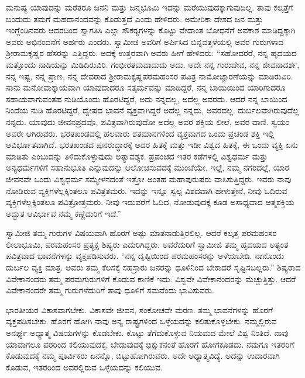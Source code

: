  ಮನುಷ್ಯ ಯಾವುದನ್ನು ಮರೆತರೂ ಜನನಿ ಮತ್ತು ಜನ್ಮಭೂಮಿ ಇದನ್ನು ಮರೆಯುವುದಕ್ಕಾಗುವುದಿಲ್ಲ. ತಾವು ಕಲ್ಕತ್ತೆಗೆ ಬಂದುದು ತಮಗೆ ಮಹದಾನಂದವನ್ನು ಕೊಡುತ್ತದೆ ಎಂದು ಹೇಳಿದರು. ಅಮೇರಿಕಾ ದೇಶದ ಜನ ಮತ್ತು ಇಂಗ್ಲೆಂಡಿನವರು ಆದರದಿಂದ ಸ್ವಾಗತಿಸಿ ಎಲ್ಲಾ ಸೌಕರ‍್ಯಗಳನ್ನು ಕೊಟ್ಟು ವೇದಾಂತ ಬೋಧನೆಗೆ ಅವಕಾಶ ಮಾಡಿದ್ದಕ್ಕಾಗಿ ಅವರು ಅಭಿನಂದನೆಗೆ ಅರ್ಹರು ಎಂದರು. ಸ್ವಾಮೀಜಿ ಅವರಿಗೆ ಅರ್ಪಿಸಿದ ಬಿನ್ನವತ್ತಳೆಯಲ್ಲಿ ಅವರ ಗುರುಗಳಾದ ಶ‍್ರೀರಾಮಕೃಷ್ಣರ ಹೆಸರನ್ನು ಎತ್ತಿದ್ದರು. ಅದಕ್ಕೆ ಉತ್ತರವಾಗಿ ಅವರು ಹೀಗೆ ಹೇಳಿದರು: “ಸಹೋದರರೆ, ನನ್ನ ಹೃದಯದ ಮತ್ತೊಂದು ನಾಡಿಯನ್ನು ಮಿಡಿದಿರುವಿರಿ. ಗಂಭೀರತಮವಾದುದು ಅದು. ಅದೇ ನನ್ನ ಗುರುದೇವ, ನನ್ನ ಜೀವನಾದರ್ಶ, ನನ್ನ ಇಷ್ಟ, ನನ್ನ ಪ್ರಾಣ, ನನ್ನ ದೇವರಾದ ಶ‍್ರೀರಾಮಕೃಷ್ಣಪರಮಹಂಸರ ಪವಿತ್ರ ನಾಮೋಚ್ಚಾರಣೆಯನ್ನು ಮಾಡಿರುವಿರಿ. ನಾನು ಮನೋವಾಕ್ಕಾಯವಾಗಿ ಯಾವುದಾದರೂ ಸತ್ಕರ್ಮವನ್ನು ಮಾಡಿದ್ದರೆ, ನನ್ನ ಬಾಯಿಯಿಂದ ಯಾರಿಗಾದರೂ ಸಹಾಯವಾಗುವಂತಹ ನುಡಿಯೊಂದು ಹೊರಟಿದ್ದರೆ, ಅದು ನನ್ನದಲ್ಲ, ಅದೆಲ್ಲ ಅವರದು. ಆದರೆ ನನ್ನ ಬಾಯಿಂದ ನಿಂದೆಯ ನುಡಿ ಹೊರಟಿದ್ದರೆ, ದ್ವೇಷದ ಭಾವನೆ ವ್ಯಕ್ತವಾಗಿದ್ದರೆ ಅದೆಲ್ಲ ನನ್ನದು, ಅವರದಲ್ಲ. ದುರ್ಬಲವಾಗಿರುವುದೆಲ್ಲ ನನ್ನದು. ಯಾವುದು ಜೀವನಪ್ರದವೊ, ಪವಿತ್ರವಾಗಿರುವುದೋ ಅದೆಲ್ಲ ಅವರ ಶಕ್ತಿಯ ಲೀಲೆ, ಅವರ ವಾಣಿ. ಸ್ವಯಂ ಅವರೇ ಆಗಿರುವರು. ಭರತಖಂಡದಲ್ಲಿ ಹಲವಾರು ಶತಮಾನಗಳಿಂದ ವ್ಯಕ್ತವಾಗದ ಒಂದು ಪ್ರಚಂಡ ಶಕ್ತಿ ಇಲ್ಲಿ ಆವಿರ್ಭೂತವಾಗಿದೆ. ಭರತಖಂಡದ ಪುನರುದ್ಧಾರಕ್ಕೆ ಅದರ ಹಿತಕ್ಕೆ ಮತ್ತು ಇಡೀ ವಿಶ್ವದ ಹಿತಕ್ಕೆ, ಈ ಒಂದು ವ್ಯಕ್ತಿ ಏನು ಮಾಡಿತು ಎಂಬುದನ್ನು ತಿಳಿದುಕೊಳ್ಳುವುದು ಅತ್ಯಾವಶ್ಯಕ. ಪ್ರಪಂಚದ ಇತರ ಕಡೆಗಳಲ್ಲಿ ವಿಶ್ವಧರ್ಮ ಮತ್ತು ಅನ್ಯಧರ್ಮಗಳಿಗೆ ಸಹಾನುಭೂತಿ ಎನ್ನುವುದನ್ನು ಆಲೋಚಿಸುವದಕ್ಕೆ ಮುಂಚೆಯೇ, ಇಲ್ಲೆ, ನಮ್ಮ ನಗರದಲ್ಲೆ, ಯಾರ ಜೀವನವೇ ಒಂದು ವಿಶ್ವಧರ್ಮ ಸಮ್ಮೇಳನದಂತೆ ಇತ್ತೋ ಅಂತಹ ಮಹಾಪುರುಷರು ವಾಸಿಸುತ್ತಿದ್ದರು. ಇವರು ನಾವು ನೋಡಿರುವ ವ್ಯಕ್ತಿಗಳೆಲ್ಲಕ್ಕಿಂತಲೂ ಪವಿತ್ರತಮರು. ಇದನ್ನು ಇನ್ನೂ ಸ್ವಲ್ಪ ವಿಶದವಾಗಿ ಹೇಳುತ್ತೇನೆ, ನೀವು ಓದಿರುವ ವ್ಯಕ್ತಿಗಳೆಲ್ಲಕ್ಕಿಂತಲೂ ಪವಿತ್ರೋತ್ತಮರು. ನೀವು ಇದುವರೆಗೆ ಓದಿದ, ನೋಡುವುದಕ್ಕೆ ಕೂಡ ಅಸಾಧ್ಯವಾದ ಆತ್ಮಶಕ್ತಿಯ ಅದ್ಭುತ ಆವಿರ್ಭಾವ ನಮ್ಮ ಕಣ್ಣೆದುರಿಗೆ ಇದೆ.” 

 ಸ್ವಾಮೀಜಿ ತಮ್ಮ ಗುರುಗಳ ವಿಷಯವಾಗಿ ಹೊರಗೆ ಅಷ್ಟು ಮಾತನಾಡುತ್ತಿರಲಿಲ್ಲ. ಆದರೆ ಕಲ್ಕತ್ತ ಪರಮಹಂಸರ ಲೀಲಾಭೂಮಿ, ಪರಮಹಂಸರ ಪ್ರತ್ಯಕ್ಷ ಶಿಷ್ಯರು ಎದುರಿಗಿದ್ದರು. ಅವರೆದುರಿಗೆ ಸ್ವಾಮೀಜಿ ತಮ್ಮ ಹೃದಯದ ಅತ್ಯಂತ ಪವಿತ್ರವಾದ ಭಾವನೆಗಳನ್ನು ವ್ಯಕ್ತಪಡಿಸುವರು. “ನನ್ನ ದೃಷ್ಟಿಯಿಂದ ಪರಮಹಂಸರನ್ನು ಅಳೆಯಬೇಡಿ. ನಾನೊಂದು ದುರ್ಬಲ ವ್ಯಕ್ತಿ ಮಾತ್ರ. ಅವರು ತಮ್ಮ ಕೆಲಸಕ್ಕೆ ಸಹಸ್ರಾರು ಜನರನ್ನು ಧೂಳಿನಿಂದ ಬೇಕಾದರೆ ಸೃಷ್ಟಿಸಬಲ್ಲರು.” ಶಿಷ್ಯರಾದ ವಿವೇಕಾನಂದರು ತಮ್ಮ ಪರಮಗುರುಗಳಿಗೆ ಕೊಡುವ ಕಾಣಿಕೆ ಇದು. ವಿಶ್ವವೇ ವಿವೇಕಾನಂದರನ್ನು ಮೆಚ್ಚುತ್ತಿತ್ತು. ಆದರೆ ವಿವೇಕಾನಂದರೇ ತಮ್ಮ ಗುರುಗಳೆದುರಿಗೆ ತಾವು ಧೂಳಿಗೆ ಸಮವೆಂದು ಭಾವಿಸುವರು. 

 ಭಾರತೀಯರ ವಿಕಾಸವಾಗಬೇಕು. ವಿಕಾಸವೇ ಜೀವನ, ಸಂಕೋಚವೇ ಮರಣ. ತಮ್ಮ ಭಾವನೆಗಳನ್ನು ಹೊರಗೆ ವ್ಯಕ್ತಪಡಿಸಬೇಕು. ಹೊರಗೆ ಹೋಗಿ ನಾವು ಅನ್ಯ ರಾಷ್ಟ್ರಗಳಿಂದ ಒಳ್ಳೆಯದನ್ನು ಕಲಿತುಕೊಳ್ಳಬೇಕು. ನಮ್ಮಲ್ಲಿರುವ ಅನರ್ಘ್ಯ ಅಧ್ಯಾತ್ಮ ವಿಷಯಗಳನ್ನು ಕೊಡಬೇಕು. ಕೊಟ್ಟು ತೆಗೆದುಕೊಳ್ಳುವ ನಿಯಮದ ಮೇಲೆ ವಿಶ್ವ ನಿಂತಿದೆ. ನಾವು ಯಾವಾಗಲೂ ಪರರಿಂದ ಕಲಿಯುವುದಕ್ಕೆ, ಬೇಡುವುದಕ್ಕೆ ಭಿಕ್ಷುಕನಂತೆ ಹೊರಗೆ ಹೋಗಕೂಡದು. ನಮಗೂ ಇತರರಿಗೆ ಕೊಡುವುದಕ್ಕೆ ನಮ್ಮ ಪೂರ್ವಿಕರು ಏನನ್ನೊ, ಬಿಟ್ಟುಹೋಗಿರುವರು. ಅದೇ ಅಧ್ಯಾತ್ಮವಿದ್ಯೆ. ಅದನ್ನು ಉದಾರವಾಗಿ ಕೊಡುವ, ಇತರರಿಂದ ಅವರಲ್ಲಿರುವ ಒಳ್ಳೆಯದನ್ನು ಕಲಿಯುವ. 

